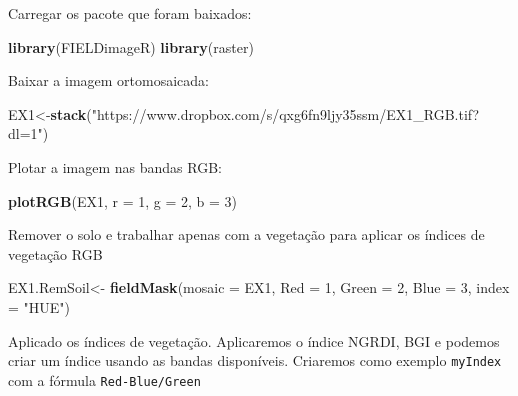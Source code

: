 \documentclass[
]{book}
\newenvironment{Shaded}{\begin{snugshade}}{\end{snugshade}}
\newcommand{\DataTypeTok}[1]{\textcolor[rgb]{0.13,0.29,0.53}{#1}}
\newcommand{\DecValTok}[1]{\textcolor[rgb]{0.00,0.00,0.81}{#1}}
\newcommand{\KeywordTok}[1]{\textcolor[rgb]{0.13,0.29,0.53}{\textbf{#1}}}
\newcommand{\NormalTok}[1]{#1}
\newcommand{\OperatorTok}[1]{\textcolor[rgb]{0.81,0.36,0.00}{\textbf{#1}}}
\newcommand{\StringTok}[1]{\textcolor[rgb]{0.31,0.60,0.02}{#1}}
\begin{document}
Carregar os pacote que foram baixados:

\begin{Shaded}
\begin{Highlighting}[]
\KeywordTok{library}\NormalTok{(FIELDimageR)}
\KeywordTok{library}\NormalTok{(raster)}
\end{Highlighting}
\end{Shaded}

Baixar a imagem ortomosaicada:

\begin{Shaded}
\begin{Highlighting}[]
\NormalTok{EX1<-}\KeywordTok{stack}\NormalTok{(}\StringTok{"https://www.dropbox.com/s/qxg6fn9ljy35ssm/EX1_RGB.tif?dl=1"}\NormalTok{)}
\end{Highlighting}
\end{Shaded}

Plotar a imagem nas bandas RGB:

\begin{Shaded}
\begin{Highlighting}[]
\KeywordTok{plotRGB}\NormalTok{(EX1, }\DataTypeTok{r =} \DecValTok{1}\NormalTok{, }\DataTypeTok{g =} \DecValTok{2}\NormalTok{, }\DataTypeTok{b =} \DecValTok{3}\NormalTok{)}
\end{Highlighting}
\end{Shaded}

Remover o solo e trabalhar apenas com a vegetação para aplicar os índices de vegetação RGB

\begin{Shaded}
\begin{Highlighting}[]
\NormalTok{EX1.RemSoil<-}\StringTok{ }\KeywordTok{fieldMask}\NormalTok{(}\DataTypeTok{mosaic =}\NormalTok{ EX1, }\DataTypeTok{Red =} \DecValTok{1}\NormalTok{, }\DataTypeTok{Green =} \DecValTok{2}\NormalTok{, }\DataTypeTok{Blue =} \DecValTok{3}\NormalTok{, }\DataTypeTok{index =} \StringTok{"HUE"}\NormalTok{)}
\end{Highlighting}
\end{Shaded}

Aplicado os índices de vegetação.
Aplicaremos o índice NGRDI, BGI e podemos criar um índice usando as bandas disponíveis. Criaremos como exemplo \texttt{myIndex} com a fórmula \texttt{Red-Blue/Green}

\begin{Shaded}
\end{Shaded}
\end{document}
